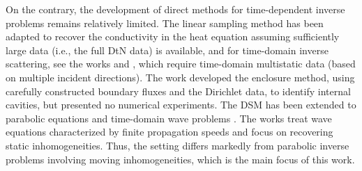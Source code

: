 \documentclass[onefignum,onetabnum]{siamart190516}
\numberwithin{equation}{section}
\begin{document}
On the contrary, the development of direct methods for time-dependent inverse problems remains relatively limited.
The linear sampling method has been adapted to recover the conductivity in the heat equation \cite{Sun2024,Heck2012,Nakamura2013} assuming sufficiently large data (i.e., the full DtN data) is available, and for time-domain inverse scattering, see the works \cite{CakoniRezac:2017} and \cite{GengSong:2025}, which require time-domain multistatic data (based on multiple incident directions).
The work \cite{ikehata2009} developed
the enclosure method, using carefully constructed boundary fluxes and the Dirichlet data, to identify internal cavities, but presented no numerical experiments.
The DSM has been extended to parabolic equations \cite{ChowItoZou:2018sisc} and time-domain wave problems \cite{guo2016time,guo2024novel}.
The works \cite{guo2016time,guo2024novel} treat wave equations characterized by finite propagation speeds and focus on recovering static inhomogeneities.
Thus, the setting differs markedly from parabolic inverse problems involving moving inhomogeneities, which is the main focus of this work.
\end{document}

